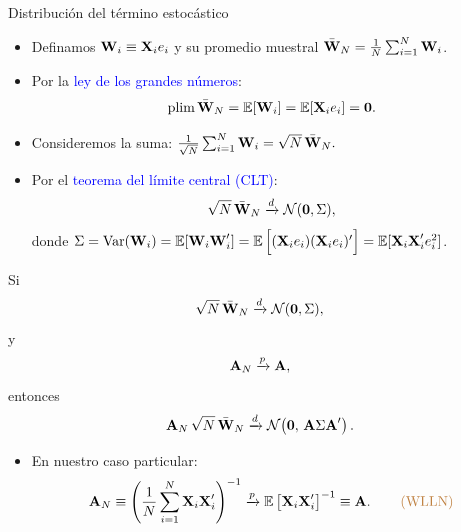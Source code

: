 \documentclass[10pt, xcolor=dvipsnames]{beamer}
\begin{document}
\begin{frame}{Distribución del término estocástico}
\begin{itemize}
    \item Definamos \(\textbf{W}_i \equiv \textbf{X}_i e_i\) y su promedio muestral \(\bar{\textbf{W}}_N = \frac{1}{N}\sum_{i=1}^N \textbf{W}_i\).    
    \vspace{0.5em}
    \item Por la \textcolor{blue}{ley de los grandes números}:
    \[
        \plim \bar{\WB}_N = \EX[\WB_i] = \EX[\XB_i e_i] = \textbf{0}.
    \]   
    \item Consideremos la suma:
    \(
        \frac{1}{\sqrt{N}}\sum_{i=1}^{N}\textbf{W}_i 
        = \sqrt{N}\,\bar{\textbf{W}}_N.
    \)
    \vspace{0.5em}
    \item Por el \textcolor{blue}{teorema del límite central (CLT)}:
    \[
        \sqrt{N}\,\bar{\textbf{W}}_N \xrightarrow{d} \mathcal{N}(\textbf{0},\Sigma),
    \]
    donde \(\Sigma = \operatorname{Var}(\textbf{W}_i) = \operatorname{\mathbb{E}}[\textbf{W}_i \textbf{W}_i'] = \operatorname{\mathbb{E}}\Big[(\textbf{X}_i e_i) (\textbf{X}_i e_i)'\Big] = \operatorname{\mathbb{E}}[\textbf{X}_i \textbf{X}'_i e^2_i]\).
\end{itemize}
\end{frame}


\begin{frame}[plain]
\begin{tcolorbox}[colback=white, arc=0mm, boxrule=0.5pt, 
    title=\textbf{Teorema de Slutsky (corolario)}, breakable]

    Si 
    \[
        \sqrt{N}\,\bar{\textbf{W}}_N \xrightarrow{d} \mathcal{N}(\textbf{0}, \Sigma),
    \]
    y 
    \[
        \textbf{A}_N \xrightarrow{p} \textbf{A},
    \]
    entonces
    \[
        \textbf{A}_N \,\sqrt{N}\,\bar{\textbf{W}}_N \xrightarrow{d} \mathcal{N}\!\left(\textbf{0},\, \textbf{A} \Sigma \textbf{A}' \right).
    \]
\end{tcolorbox}	
\begin{itemize}
    \item En nuestro caso particular:
    \[
        \textbf{A}_N \equiv \Bigg(\frac{1}{N}\sum_{i=1}^{N}\textbf{X}_i \textbf{X}'_i \Bigg)^{-1} \xrightarrow{p} \operatorname{\mathbb{E}}\left[\textbf{X}_i \textbf{X}'_i\right]^{-1} \equiv \textbf{A}. \hspace{0.75cm} \text{\color{brown} (WLLN)} 
    \]
\end{itemize}
\end{frame}
\end{document}
